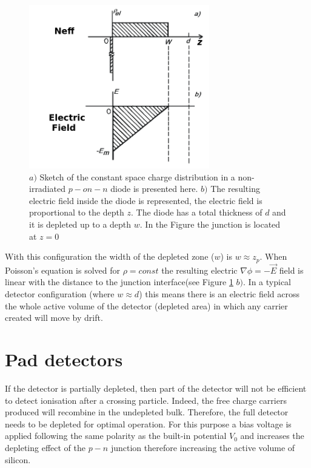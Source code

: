 \begin{figure}[H]
	\centering
	\includegraphics[width=0.7\textwidth]{Neff_unirrad.png}
	\caption{$a)$ Sketch of the constant space charge distribution in a non-irradiated $p-on-n$ diode is presented here. $b)$ The resulting electric field inside the diode is represented, the electric field is proportional to the depth $z$. The diode has a total thickness of $d$ and it is depleted up to a depth $w$. In the Figure the junction is located at $z = 0$}
	\label{fig:neffEfield}
\end{figure}


With this configuration the width of the depleted zone ($w$) is $w \approx z_p$.
When Poisson's equation is solved for $\rho = const$ the resulting electric
$\nabla \phi = -\overrightarrow {E}$ field is linear with the distance to the 
junction  interface(see Figure \ref{fig:neffEfield} $b)$. In a typical detector 
configuration (where $w \approx d$) this means there is an electric field 
across the whole active volume of the detector (depleted area) in which any 
carrier created will move by drift. 


\section{Pad detectors}
\label{sec:detConfig}

If the detector is partially depleted, then part of the detector will not be
efficient to detect ionisation after a crossing particle. Indeed, the free
charge carriers produced will recombine in the undepleted bulk. Therefore, the
full detector needs to be depleted for optimal operation. For this purpose a
bias voltage is applied following the same polarity as the built-in
potential $V_0$ and increases the depleting effect of the $p-n$ junction
therefore increasing the active volume of silicon. 

